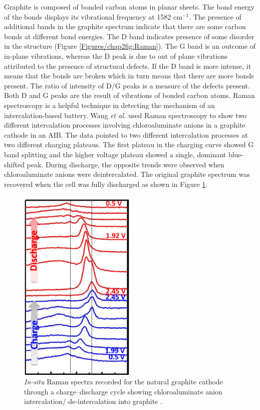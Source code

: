 Graphite is composed of  bonded carbon atoms in planar sheets. The bond energy of the  bonds displays its vibrational frequency at 1582 cm$^{-1}$. The presence of additional bands in the graphite spectrum indicate that there are some carbon bonds at different bond energies. The D band indicates presence of some disorder in the structure (Figure \ref{Figures/chap2fig:Raman}). The G band is an outcome of in-plane vibrations, whereas the D peak is due to out of plane vibrations attributed to the presence of structural defects. If the D band is more intense, it means that the  bonds are broken which in turn means that there are more  bonds present. The ratio of intensity of D/G peaks is a measure of the defects present. Both D and G peaks are the result of vibrations of  bonded carbon atoms.  
Raman spectroscopy is a helpful technique in detecting the mechanism of an intercalation-based battery. Wang \textit{et al.} used Raman spectroscopy to show two different intercalation processes involving chloroaluminate anions in a graphite cathode in an AIB. The data pointed to two different intercalation processes at two different charging plateaus. The first plateau in the charging curve showed G band splitting and the higher voltage plateau showed a single, dominant blue-shifted peak. During discharge, the opposite trends were observed when chloroaluminate anions were deintercalated. The original graphite spectrum was recovered when the cell was fully discharged\cite{wang_advanced_2017} as shown in Figure \ref{Figures/chap2fig:Raman2}. 

\begin{figure}[tbh!]
\centering
\includegraphics[width=0.5\textwidth]{Figures/chap2fig/Raman2}
\caption{\textit{In-situ} Raman spectra recorded for the natural graphite cathode through a charge–discharge cycle showing chloroaluminate anion intercalation/ de-intercalation into graphite \cite{wang_advanced_2017}.}
\label{Figures/chap2fig:Raman2}
\end{figure}

